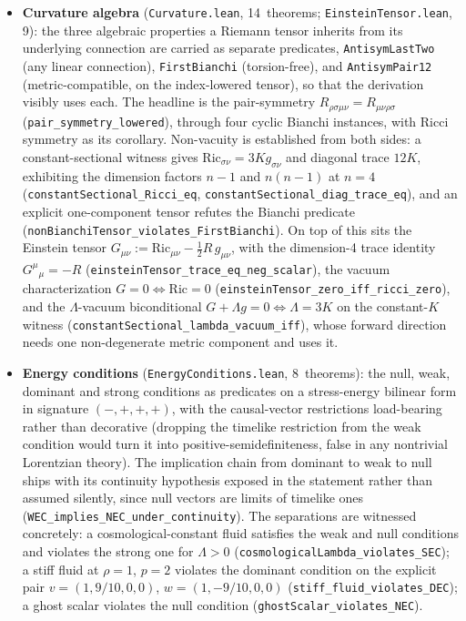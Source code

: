 \documentclass[11pt]{article}
\providecommand{\curvatureThms}{14}
\providecommand{\einsteinTensorThms}{9}
\providecommand{\energyConditionsThms}{8}
\begin{document}
\begin{itemize}
\item \textbf{Curvature algebra} (\texttt{Curvature.lean},
\curvatureThms{}~theorems; \texttt{EinsteinTensor.lean},
\einsteinTensorThms{}): the three algebraic properties a Riemann
tensor inherits from its underlying connection are carried as
separate predicates, \texttt{AntisymLastTwo} (any linear
connection), \texttt{FirstBianchi} (torsion-free), and
\texttt{AntisymPair12} (metric-compatible, on the index-lowered
tensor), so that the derivation visibly uses each. The headline is
the pair-symmetry $R_{\rho\sigma\mu\nu} = R_{\mu\nu\rho\sigma}$
(\texttt{pair\_symmetry\_lowered}), through four cyclic Bianchi
instances, with Ricci symmetry as its corollary.
Non-vacuity is established from both sides: a constant-sectional
witness gives $\mathrm{Ric}_{\sigma\nu} = 3K g_{\sigma\nu}$ and
diagonal trace $12K$, exhibiting the dimension factors $n-1$ and
$n(n-1)$ at $n = 4$ (\texttt{constantSectional\_Ricci\_eq},
\texttt{constantSectional\_diag\_trace\_eq}), and an explicit
one-component tensor refutes the Bianchi predicate
(\texttt{nonBianchiTensor\_violates\_FirstBianchi}). On top of this
sits the Einstein tensor $G_{\mu\nu} := \mathrm{Ric}_{\mu\nu} -
\tfrac{1}{2}R\,g_{\mu\nu}$, with the dimension-4 trace identity
$G^{\mu}{}_{\mu} = -R$
(\texttt{einsteinTensor\_trace\_eq\_neg\_scalar}), the vacuum
characterization $G = 0 \iff \mathrm{Ric} = 0$
(\texttt{einsteinTensor\_zero\_iff\_ricci\_zero}), and the
$\Lambda$-vacuum biconditional $G + \Lambda g = 0 \iff \Lambda = 3K$
on the constant-$K$ witness
(\texttt{constantSectional\_lambda\_vacuum\_iff}), whose forward
direction needs one non-degenerate metric component and uses it.

\item \textbf{Energy conditions} (\texttt{EnergyConditions.lean},
\energyConditionsThms{}~theorems): the null, weak, dominant and
strong conditions as predicates on a stress-energy bilinear form in
signature $(-,+,+,+)$, with the causal-vector restrictions
load-bearing rather than decorative (dropping the timelike
restriction from the weak condition would turn it into
positive-semidefiniteness, false in any nontrivial Lorentzian
theory). The implication chain from dominant to weak to null ships
with its continuity hypothesis exposed in the statement rather than
assumed silently, since null vectors are limits of timelike ones
(\texttt{WEC\_implies\_NEC\_under\_continuity}). The separations are
witnessed concretely: a cosmological-constant fluid satisfies the
weak and null conditions and violates the strong one for $\Lambda
> 0$ (\texttt{cosmologicalLambda\_violates\_SEC}); a stiff fluid at
$\rho = 1$, $p = 2$ violates the dominant condition on the explicit
pair $v = (1, 9/10, 0, 0)$, $w = (1, -9/10, 0, 0)$
(\texttt{stiff\_fluid\_violates\_DEC}); a ghost scalar violates the
null condition (\texttt{ghostScalar\_violates\_NEC}).


\end{itemize}
\end{document}
